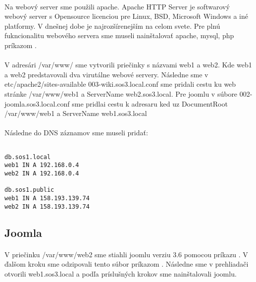 \paragraph{}
Na webový server sme použili apache. Apache HTTP Server je softwarový webový server s Opensource licenciou pre Linux, BSD, Microsoft Windows a iné platformy. V dnešnej dobe je najrozšírenejším na celom svete. Pre plnú fukncionalitu webového servera sme museli nainštalovať apache, mysql, php príkazom  .
\paragraph{}
V adresári /var/www/ sme vytvorili priečinky s názvami web1 a web2. Kde web1 a web2 predstavovali dva virutálne webové servery. Následne sme v etc/apache2/sites-available 003-wiki.sos3.local.conf sme pridali cestu ku web stránke /var/www/web1 a ServerName web2.sos3.local. Pre joomlu v súbore 002-joomla.sos3.local.conf sme pridlai cestu k adresaru ked uz DocumentRoot /var/www/web1 a ServerName web1.sos3.local
\paragraph{}
Následne do DNS záznamov sme museli pridať:\\

\noindent
{\selectfont

\begin{small}

\begin{verbatim}

db.sos1.local
web1 IN A 192.168.0.4
web2 IN A 192.168.0.4

db.sos1.public
web1 IN A 158.193.139.74
web2 IN A 158.193.139.74

\end{verbatim}

\end{small}

}

\subsection{Joomla}
\paragraph{}
V priečinku /var/www/web2 sme stiahli joomlu verziu 3.6 pomocou príkazu  . V ďalšom kroku sme odzipovali tento súbor príkazom  . Následne sme v prehliadači otvorili web1.sos3.local a podľa príslušných krokov sme nainštalovali joomlu.

